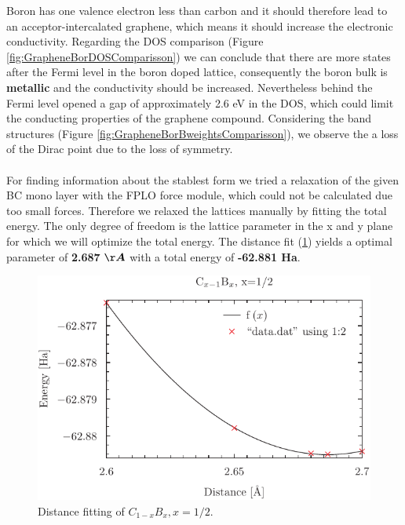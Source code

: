 				Boron has one valence electron less than carbon and it should therefore lead to an acceptor-intercalated graphene, which means it should increase the electronic conductivity. Regarding the DOS comparison (Figure \ref{fig:GrapheneBorDOSComparisson}) we can conclude that there are more states after the Fermi level in the boron doped lattice, consequently the boron bulk is \textbf{metallic} and the conductivity should be increased. Nevertheless behind the Fermi level opened a gap of approximately 2.6 eV in the DOS, which could limit the conducting properties of the graphene compound. Considering the band structures (Figure \ref{fig:GrapheneBorBweightsComparisson}), we observe the a loss of the Dirac point due to the loss of symmetry. \\\\
				For finding information about the stablest form we tried a relaxation of the given BC mono layer with the FPLO force module, which could not be calculated due too small forces. Therefore we relaxed the lattices manually by fitting the total energy. The only degree of freedom is the lattice parameter in the x and y plane for which we will optimize the total energy. The distance fit (\ref{fig:boronFitting}) yields a optimal parameter of \textbf{2.687} $\boldsymbol{\AA}$ with a total energy of \textbf{-62.881 Ha}.
				\begin{figure}
					\includegraphics[width=\textwidth]{Results/Bor/Bor1R/data.pdf}
					\caption{Distance fitting of $C_{1-x}B_x,x= 1 / 2$.}
					\label{fig:boronFitting}
				\end{figure}
			
